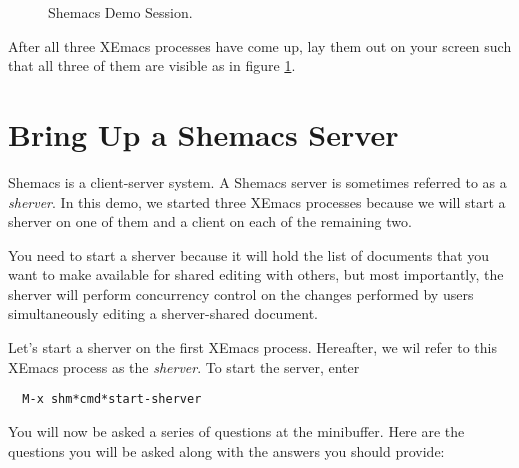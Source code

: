 \begin{figure}[htbp]
\centerline{}
\caption{Shemacs Demo Session.}
\label{fig:shemacs-demo-session}
\end{figure}

After all three XEmacs processes have come up, lay them out on your screen
such that all three of them are visible as in figure
\ref{fig:shemacs-demo-session}.

\section{Bring Up a Shemacs Server}

Shemacs is a client-server system.  A Shemacs server is sometimes referred
to as a {\it sherver\/}.  In this demo, we started three XEmacs processes
because we will start a sherver on one of them and a client on each of the
remaining two.

You need to start a sherver because it will hold the list of documents that
you want to make available for shared editing with others, but most
importantly, the sherver will perform concurrency control on the changes
performed by users simultaneously editing a sherver-shared document.

Let's start a sherver on the first XEmacs process.  Hereafter, we wil refer
to this XEmacs process as the {\it sherver\/}.  To start the server, enter

\small\begin{verbatim}
  M-x shm*cmd*start-sherver
\end{verbatim}\normalsize

You will now be asked a series of questions at the minibuffer.  Here are
the questions you will be asked along with the answers you should provide:


